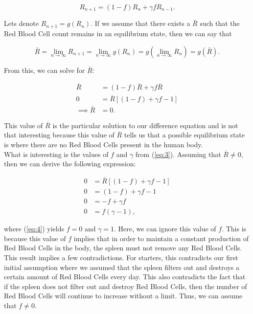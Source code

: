 \begin{equation}\label{eq:2}
    R_{n+1} =  (1-f)R_n + \gamma fR_{n-1}.
\end{equation}

Lets denote $R_{n+1} = g(R_n)$. If we assume that there exists a $\bar{R}$ such that the Red Blood Cell count remains in an equilibrium state, then we can say that

\[
\bar{R} = \lim_{n\to\infty} R_{n+1} = \lim_{n\to\infty} g(R_n) = g\left(\lim_{n\to\infty} R_n\right) = g(\bar{R}).
\]

From this, we can solve for $\bar{R}$:

\begin{align}
    \bar{R} &= (1-f)\bar{R} + \gamma f\bar{R} \nonumber\\
    0 &= \bar{R}[(1-f) + \gamma f - 1] \label{eq:3} \\ 
    \implies \bar{R} &= 0. \nonumber
\end{align}

This value of $\bar{R}$ is the particular solution to our difference equation and is not that interesting because this value of $\bar{R}$ tells us that a possible equilibrium state is where there are no Red Blood Cells present in the human body. \\

What is interesting is the values of $f$ and $\gamma$ from (\ref{eq:3}). Assuming that $\bar{R} \neq 0$, then we can derive the following expression:

\begin{align} 
    0 &= \bar{R}[(1-f) + \gamma f - 1] \nonumber\\
    0 &= (1-f) + \gamma f - 1 \nonumber\\
    0 &= -f + \gamma f \nonumber\\
    0 &= f(\gamma - 1), \label{eq:4}
\end{align}

where (\ref{eq:4}) yields $f=0$ and $\gamma=1$. Here, we can ignore this value of $f$. This is because this value of $f$ implies that in order to maintain a constant production of Red Blood Cells in the body, the spleen must not remove any Red Blood Cells. This result implies a few contradictions. For starters, this contradicts our first initial assumption where we assumed that the spleen filters out and destroys a certain amount of Red Blood Cells every day. This also contradicts the fact that if the spleen does not filter out and destroy Red Blood Cells, then the number of Red Blood Cells will continue to increase without a limit. Thus, we can assume that $f\neq0$.\\


